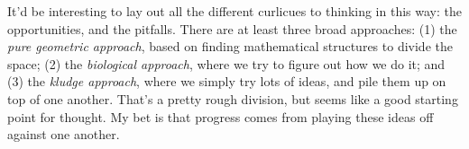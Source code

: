\documentclass[12pt]{article}
\begin{document}
It'd be interesting to lay out all the different curlicues to thinking
in this way: the opportunities, and the pitfalls.  There are at least
three broad approaches: (1) the \emph{pure geometric approach}, based
on finding mathematical structures to divide the space; (2) the
\emph{biological approach}, where we try to figure out how we do it;
and (3) the \emph{kludge approach}, where we simply try lots of ideas,
and pile them up on top of one another.  That's a pretty rough
division, but seems like a good starting point for thought.  My bet is
that progress comes from playing these ideas off against one another.
\end{document}
